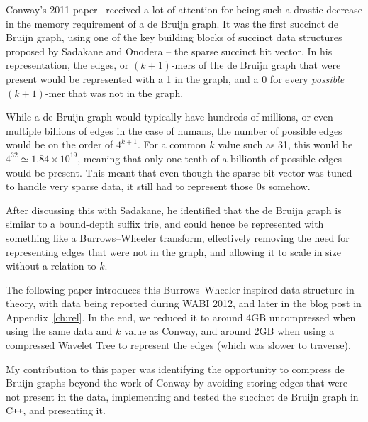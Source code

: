 Conway's 2011 paper~\cite{conway} received a lot of attention for being such a drastic decrease in the memory requirement of a de Bruijn graph. It was the first succinct de Bruijn graph, using one of the key building blocks of succinct data structures proposed by Sadakane and Onodera -- the sparse succinct bit vector. In his representation, the edges, or $(k+1)$-mers of the de Bruijn graph that were present would be represented with a 1 in the graph, and a 0 for every \emph{possible} $(k+1)$-mer that was not in the graph.

While a de Bruijn graph would typically have hundreds of millions, or even multiple billions of edges in the case of humans, the number of possible edges would be on the order of $4^{k+1}$. For a common $k$ value such as 31, this would be $4^{32} \simeq 1.84 \times 10^{19}$, meaning that only one tenth of a billionth of possible edges would be present. This meant that even though the sparse bit vector was tuned to handle very sparse data, it still had to represent those 0s somehow.

After discussing this with Sadakane, he identified that the de Bruijn graph is similar to a bound-depth suffix trie, and could hence be represented with something like a Burrows--Wheeler transform, effectively removing the need for representing edges that were not in the graph, and allowing it to scale in size without a relation to $k$.

The following paper introduces this Burrows--Wheeler-inspired data structure in theory, with data being reported during WABI 2012, and later in the blog post in Appendix~\ref{ch:rel}. In the end, we reduced it to around 4GB uncompressed when using the same data and $k$ value as Conway, and around 2GB when using a compressed Wavelet Tree to represent the edges (which was slower to traverse).

My contribution to this paper was identifying the opportunity to compress de Bruijn graphs beyond the work of Conway by avoiding storing edges that were not present in the data, implementing and tested the succinct de Bruijn graph in C\texttt{++}, and presenting it.

